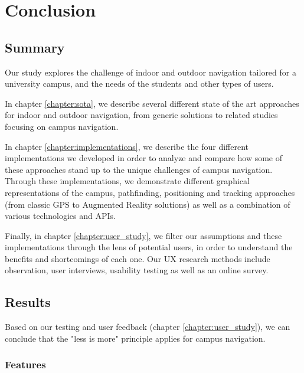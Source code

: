 \chapter{Conclusion} \label{chapter:conclusion}

\section{Summary}

    Our study explores the challenge of indoor and outdoor navigation tailored for a university campus, and the needs of the students and other types of users.
    
    In chapter \ref{chapter:sota}, we describe several different state of the art approaches for indoor and outdoor navigation, from generic solutions to related studies focusing on campus navigation.
    
    In chapter \ref{chapter:implementations}, we describe the four different implementations we developed in order to analyze and compare how some of these approaches stand up to the unique challenges of campus navigation. Through these implementations, we demonstrate different graphical representations of the campus, pathfinding, positioning and tracking approaches (from classic GPS to Augmented Reality solutions) as well as a combination of various technologies and APIs. 
    
    Finally, in chapter \ref{chapter:user_study}, we filter our assumptions and these implementations through the lens of potential users, in order to understand the benefits and shortcomings of each one. Our UX research methods include observation, user interviews, usability testing as well as an online survey.

\section{Results}

    Based on our testing and user feedback (chapter \ref{chapter:user_study}), we can conclude that the "less is more" principle applies for campus navigation.
    
    \subsection{Features} \label{5:features}
    
